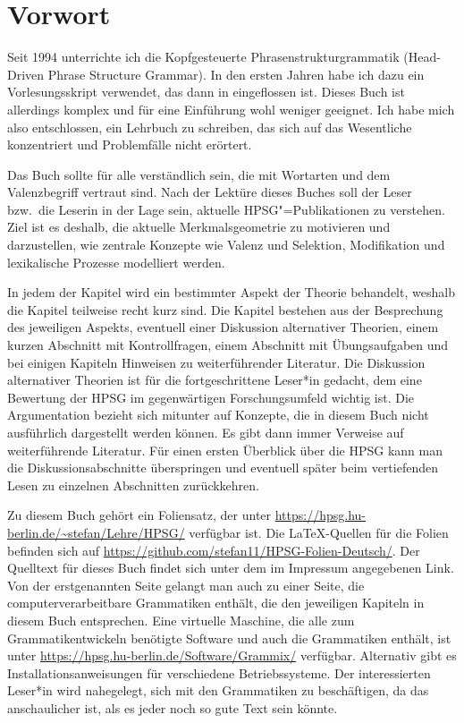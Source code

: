
\chapter{Vorwort}

Seit 1994 unterrichte ich die Kopfgesteuerte Phrasenstrukturgrammatik (Head-Driven Phrase
Structure Grammar). In den ersten Jahren habe ich dazu ein Vorlesungsskript verwendet, das
dann in  eingeflossen ist. Dieses Buch ist allerdings komplex und
für eine Einführung wohl weniger geeignet. Ich habe mich also entschlossen, ein Lehrbuch zu
schreiben, das sich auf das Wesentliche konzentriert und Problemfälle nicht erörtert.

Das Buch sollte für alle verständlich sein, die mit Wortarten und dem Valenzbegriff vertraut
sind. Nach der Lektüre dieses Buches soll der Leser bzw.\ die Leserin in der Lage sein, aktuelle
HPSG"=Publikationen zu verstehen. Ziel ist es deshalb, die aktuelle Merkmalsgeometrie zu motivieren
und darzustellen, wie zentrale Konzepte wie Valenz und Selektion, Modifikation und lexikalische
Prozesse modelliert werden.

In jedem der Kapitel wird ein bestimmter Aspekt der Theorie behandelt, weshalb die Kapitel teilweise
recht kurz sind. Die Kapitel bestehen aus der Besprechung des jeweiligen Aspekts, eventuell einer
Diskussion alternativer Theorien, einem kurzen Abschnitt mit Kontrollfragen, einem Abschnitt
mit Übungsaufgaben und bei einigen Kapiteln Hinweisen zu weiterführender Literatur. Die Diskussion
alternativer Theorien ist für die fortgeschrittene Leser*in gedacht, 
dem eine Bewertung der HPSG im gegenwärtigen Forschungsumfeld wichtig ist. Die Argumentation
bezieht sich mitunter auf Konzepte, die in diesem Buch nicht ausführlich dargestellt werden können.
Es gibt dann immer Verweise auf weiterführende Literatur. Für einen ersten Überblick über
die HPSG kann man die Diskussionsabschnitte überspringen und eventuell später beim vertiefenden
Lesen zu einzelnen Abschnitten zurückkehren.

Zu diesem Buch gehört ein Foliensatz, der unter 
\url{https://hpsg.hu-berlin.de/~stefan/Lehre/HPSG/}
verfügbar ist. Die \LaTeX-Quellen für die Folien befinden sich auf
\url{https://github.com/stefan11/HPSG-Folien-Deutsch/}. Der Quelltext für dieses Buch findet sich
unter dem im Impressum angegebenen Link.
Von der erstgenannten Seite gelangt man auch zu einer Seite, die computerverarbeitbare
Grammatiken enthält, die den jeweiligen Kapiteln in diesem Buch entsprechen. Eine virtuelle Maschine, die
alle zum Grammatikentwickeln benötigte Software und auch die Grammatiken enthält, ist unter
\url{https://hpsg.hu-berlin.de/Software/Grammix/} verfügbar. Alternativ gibt es
Installationsanweisungen für verschiedene Betriebssysteme. Der interessierten Leser*in
wird nahegelegt, sich mit den Grammatiken zu beschäftigen, da das anschaulicher ist,
als es jeder noch so gute Text sein könnte.

